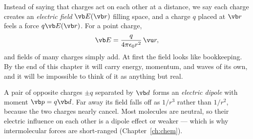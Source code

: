 Instead of saying that charges act on each other at a distance, we say each charge creates an \emph{electric field} $\vb E(\vb r)$ filling space, and a charge $q$ placed at $\vb r$ feels a force $q\vb E(\vb r)$. For a point charge,
\[
  \vb E = \frac{q}{4\pi\epsilon_0 r^2}\,\vu r ,
\]
and fields of many charges simply add. At first the field looks like bookkeeping. By the end of this chapter it will carry energy, momentum, and waves of its own, and it will be impossible to think of it as anything but real.

A pair of opposite charges $\pm q$ separated by $\vb d$ forms an \emph{electric dipole} with moment $\vb p = q\vb d$. Far away its field falls off as $1/r^3$ rather than $1/r^2$, because the two charges nearly cancel. Most molecules are neutral, so their electric influence on each other is a dipole effect or weaker --- which is why intermolecular forces are short-ranged (Chapter~\ref{ch:chem}).

